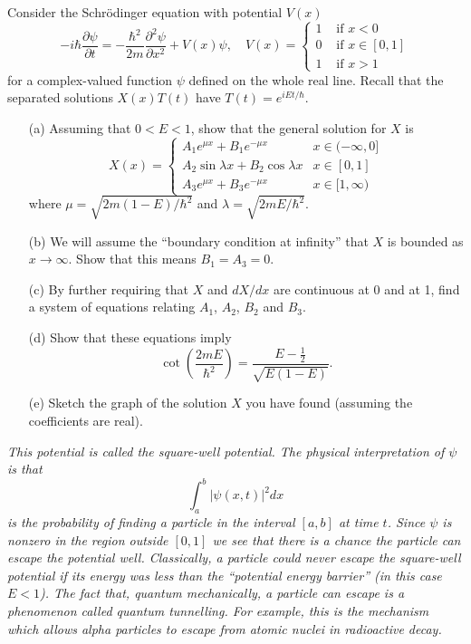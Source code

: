 \documentclass[12pt]{article}
\begin{document}
\begin{question}\ \\
Consider the Schr\"{o}dinger equation with potential $V(x)$
\[-i\hbar\frac{\partial\psi}{\partial t}=-\frac{\hbar^2}{2m}\frac{\partial^2\psi}{\partial x^2}+V(x)\psi,\quad V(x)=\begin{cases}
1&\mbox{ if }x<0\\
0&\mbox{ if }x\in[0,1]\\
1&\mbox{ if }x>1
\end{cases}\]
for a complex-valued function $\psi$ defined on the whole real line. Recall that the separated solutions $X(x)T(t)$ have $T(t)=e^{iEt/\hbar}$.
\begin{enumerate}
\item[(a)] Assuming that $0<E<1$, show that the general solution for $X$ is
\[X(x)=\begin{cases}
A_1e^{\mu x}+B_1e^{-\mu x}&x\in(-\infty,0]\\
A_2\sin\lambda x+B_2\cos\lambda x&x\in[0,1]\\
A_3e^{\mu x}+B_3e^{-\mu x}&x\in[1,\infty)
\end{cases}\]
where $\mu=\sqrt{2m(1-E)/\hbar^2}$ and $\lambda=\sqrt{2mE/\hbar^2}$.
\item[(b)] We will assume the ``boundary condition at infinity'' that $X$ is bounded as $x\to\infty$. Show that this means $B_1=A_3=0$.
\item[(c)] By further requiring that $X$ and $dX/dx$ are continuous at 0 and at 1, find a system of equations relating $A_1$, $A_2$, $B_2$ and $B_3$.
\item[(d)] Show that these equations imply
\[\cot\left(\frac{2mE}{\hbar^2}\right)=\frac{E-\tfrac{1}{2}}{\sqrt{E(1-E)}}.\]
\item[(e)] Sketch the graph of the solution $X$ you have found (assuming the coefficients are real).
\end{enumerate}
{\em This potential is called the square-well potential. The physical interpretation of $\psi$ is that
\[\int_a^b|\psi(x,t)|^2dx\]
is the probability of finding a particle in the interval $[a,b]$ at time $t$. Since $\psi$ is nonzero in the region outside $[0,1]$ we see that there is a chance the particle can escape the potential well. Classically, a particle could never escape the square-well potential if its energy was less than the ``potential energy barrier'' (in this case $E<1$). The fact that, quantum mechanically, a particle can escape is a phenomenon called quantum tunnelling. For example, this is the mechanism which allows alpha particles to escape from atomic nuclei in radioactive decay.}
\end{question}
\end{document}
